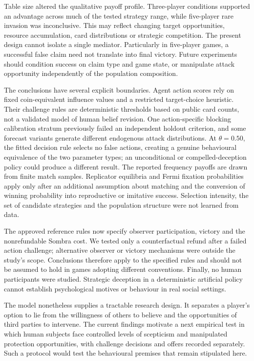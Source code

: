 \documentclass[11pt,a4paper]{article}
\begin{document}
Table size altered the qualitative payoff profile. Three-player conditions supported an advantage across much of the tested strategy range, while five-player rare invasion was inconclusive. This may reflect changing target opportunities, resource accumulation, card distributions or strategic competition. The present design cannot isolate a single mediator. Particularly in five-player games, a successful false claim need not translate into final victory. Future experiments should condition success on claim type and game state, or manipulate attack opportunity independently of the population composition.

The conclusions have several explicit boundaries. Agent action scores rely on fixed coin-equivalent influence values and a restricted target-choice heuristic. Their challenge rules are deterministic thresholds based on public card counts, not a validated model of human belief revision. One action-specific blocking calibration stratum previously failed an independent holdout criterion, and some forecast variants generate different endogenous attack distributions. At $\theta=0.50$, the fitted decision rule selects no false actions, creating a genuine behavioural equivalence of the two parameter types; an unconditional or compelled-deception policy could produce a different result. The reported frequency payoffs are drawn from finite match samples. Replicator equilibria and Fermi fixation probabilities apply only after an additional assumption about matching and the conversion of winning probability into reproductive or imitative success. Selection intensity, the set of candidate strategies and the population structure were not learned from data.

The approved reference rules now specify observer participation, victory and the nonrefundable Sombra cost. We tested only a counterfactual refund after a failed action challenge; alternative observer or victory mechanisms were outside the study's scope. Conclusions therefore apply to the specified rules and should not be assumed to hold in games adopting different conventions. Finally, no human participants were studied. Strategic deception in a deterministic artificial policy cannot establish psychological motives or behaviour in real social settings.

The model nonetheless supplies a tractable research design. It separates a player's option to lie from the willingness of others to believe and the opportunities of third parties to intervene. The current findings motivate a next empirical test in which human subjects face controlled levels of scepticism and manipulated protection opportunities, with challenge decisions and offers recorded separately. Such a protocol would test the behavioural premises that remain stipulated here.
\end{document}
